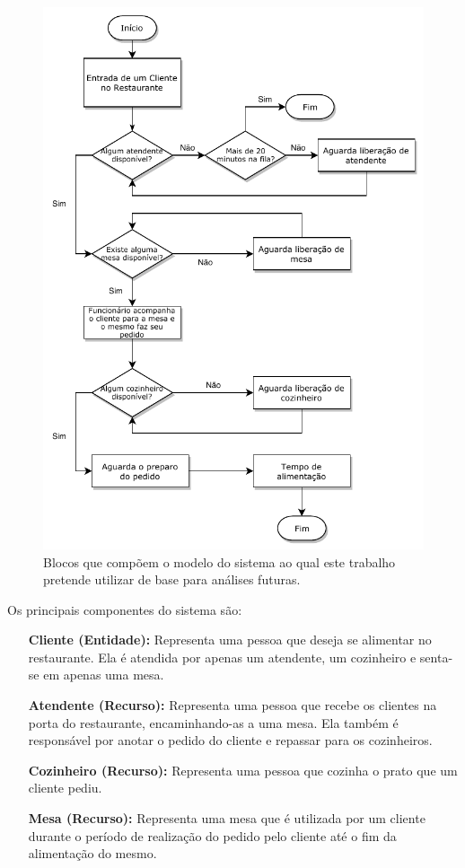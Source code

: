 \documentclass[pt,disc,oneside]{ufscpgeasthesis}
\begin{document}
			\begin{figure}[]
				\begin{center}
					\includegraphics[width=.75\textwidth]{images/Fluxograma/Fluxograma.pdf}
					\caption{Blocos que compõem o modelo do sistema ao qual este trabalho pretende utilizar de base para análises futuras.}
					\label{fig.fluxograma}
				\end{center}
			\end{figure}

			Os principais componentes do sistema são:

			\begin{itemize}
					\item[\textbf{Cliente (Entidade):}] Representa uma pessoa que deseja se alimentar no restaurante. Ela é atendida por apenas um atendente, um cozinheiro e senta-se em apenas uma mesa.
					\item[\textbf{Atendente (Recurso):}] Representa uma pessoa que recebe os clientes na porta do restaurante, encaminhando-as a uma mesa. Ela também é responsável por anotar o pedido do cliente e repassar para os cozinheiros.
					\item[\textbf{Cozinheiro (Recurso):}] Representa uma pessoa que cozinha o prato que um cliente pediu.
					\item[\textbf{Mesa (Recurso):}] Representa uma mesa que é utilizada por um cliente durante o período de realização do pedido pelo cliente até o fim da alimentação do mesmo.
			\end{itemize}
\end{document}
